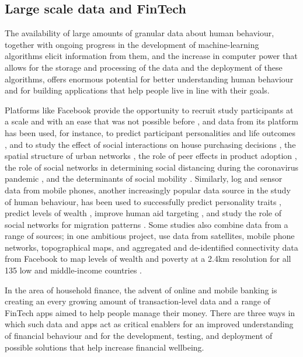 \subsection{Large scale data and FinTech}%
\label{sub:large_scale_data_and_fintech}

The availability of large amounts of granular data about human
behaviour, together with ongoing progress in the development of
machine-learning algorithms elicit information from them, and the increase in
computer power that allows for the storage and processing of the data and the
deployment of these algorithms, offers enormous potential for better
understanding human behaviour \citep{jaffe2014big, buyalskaya2021golden} and
for building applications that help people live in line with their goals.

Platforms like Facebook provide the opportunity to recruit study participants
at a scale and with an ease that was not possible before
\citep{kosinski2015facebook}, and data from its platform has been used, for
instance, to predict participant personalities and life outcomes
\citep{youyou2015computer}, and to study the effect of social interactions on
house purchasing decisions \citep{bailey2018economic, bailey2019house}, the
spatial structure of urban networks \citep{bailey2020social}, the role of peer
effects in product adoption \citep{bailey2019peer}, the role of social networks
in determining social distancing during the coronavirus pandemic
\citep{bailey2020social}, and the determinants of social mobility
\citep{chetty2022sociali, chetty2022socialii}. Similarly, log and sensor data
from mobile phones, another increasingly popular data source in the study of
human behaviour, has been used to successfully predict personality traits
\citep{montjoye2013predicting, stachl2020predicting}, predict levels of wealth
\citep{blumenstock2015predicting}, improve human aid targeting
\citep{aiken2022machine}, and study the role of social networks for migration
patterns \citep{blumenstock2019migration}. Some studies also combine data from
a range of sources; in one ambitious project, \citet{chi2022microestimates} use
data from satellites, mobile phone networks, topographical maps, and aggregated
and de-identified connectivity data from Facebook to map levels of wealth and
poverty at a 2.4km resolution for all 135 low and middle-income countries
\citep{chi2022microestimates}.

In the area of household finance, the advent of online and mobile banking is
creating an every growing amount of transaction-level data and a range of
FinTech apps aimed to help people manage their money. There are three ways in
which such data and apps act as critical enablers for an improved understanding
of financial behaviour and for the development, testing, and deployment of
possible solutions that help increase financial wellbeing.

